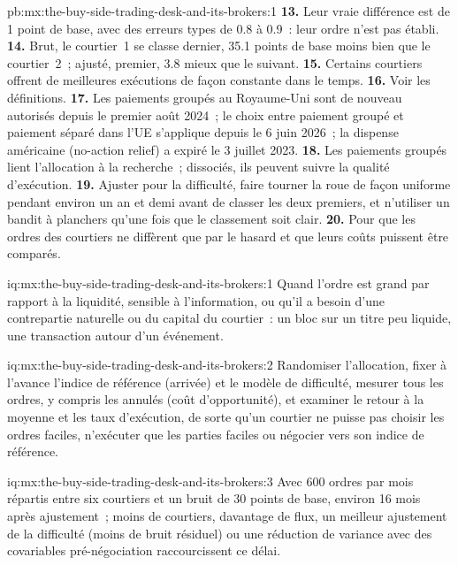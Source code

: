 \begin{solution}{pb:mx:the-buy-side-trading-desk-and-its-brokers:1}
\textbf{13.} Leur vraie différence est de 1 point de base, avec des erreurs types de 0.8 à 0.9~: leur ordre n'est pas établi.
\textbf{14.} Brut, le courtier~1 se classe dernier, 35.1 points de base moins bien que le courtier~2~; ajusté, premier, 3.8 mieux que le suivant.
\textbf{15.} Certains courtiers offrent de meilleures exécutions de façon constante dans le temps.
\textbf{16.} Voir les définitions.
\textbf{17.} Les paiements groupés au Royaume-Uni sont de nouveau autorisés depuis le premier août 2024~; le choix entre paiement groupé et paiement séparé dans l'UE s'applique depuis le 6 juin 2026~; la dispense américaine (no-action relief)
a expiré le 3 juillet 2023.
\textbf{18.} Les paiements groupés lient l'allocation à la recherche~; dissociés, ils peuvent suivre la qualité d'exécution.
\textbf{19.} Ajuster pour la difficulté, faire tourner la roue de façon uniforme pendant environ un an et demi avant de classer les deux premiers, et n'utiliser un bandit à planchers qu'une fois
que le classement soit clair.
\textbf{20.} Pour que les ordres des courtiers ne diffèrent que par le hasard et que leurs coûts puissent être comparés.
\end{solution}

\begin{solution}{iq:mx:the-buy-side-trading-desk-and-its-brokers:1}
Quand l'ordre est grand par rapport à la liquidité, sensible à l'information, ou qu'il a besoin d'une contrepartie naturelle ou du capital du courtier~: un bloc sur un
titre peu liquide, une transaction autour d'un événement.
\end{solution}

\begin{solution}{iq:mx:the-buy-side-trading-desk-and-its-brokers:2}
Randomiser l'allocation, fixer à l'avance l'indice de référence (arrivée) et le modèle de difficulté, mesurer tous les ordres, y compris les annulés (coût
d'opportunité), et examiner le retour à la moyenne et les taux d'exécution, de sorte qu'un courtier ne puisse pas choisir les ordres faciles, n'exécuter que les parties faciles ou négocier vers son indice de référence.
\end{solution}

\begin{solution}{iq:mx:the-buy-side-trading-desk-and-its-brokers:3}
Avec 600 ordres par mois répartis entre six courtiers et un bruit de 30 points de base, environ 16 mois après ajustement~; moins de courtiers, davantage de flux, un meilleur ajustement de la difficulté
(moins de bruit résiduel) ou une réduction de variance avec des covariables pré-négociation raccourcissent ce délai.
\end{solution}

